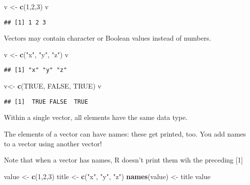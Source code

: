 \documentclass[
]{article}
\newenvironment{Shaded}{\begin{snugshade}}{\end{snugshade}}
\newcommand{\DecValTok}[1]{\textcolor[rgb]{0.00,0.00,0.81}{#1}}
\newcommand{\KeywordTok}[1]{\textcolor[rgb]{0.13,0.29,0.53}{\textbf{#1}}}
\newcommand{\NormalTok}[1]{#1}
\newcommand{\OtherTok}[1]{\textcolor[rgb]{0.56,0.35,0.01}{#1}}
\newcommand{\StringTok}[1]{\textcolor[rgb]{0.31,0.60,0.02}{#1}}
\begin{document}
\begin{Shaded}
\begin{Highlighting}[]
\NormalTok{  v <-}\StringTok{ }\KeywordTok{c}\NormalTok{(}\DecValTok{1}\NormalTok{,}\DecValTok{2}\NormalTok{,}\DecValTok{3}\NormalTok{)}
\NormalTok{  v}
\end{Highlighting}
\end{Shaded}

\begin{verbatim}
## [1] 1 2 3
\end{verbatim}

Vectors may contain character or Boolean values instead of numbers.

\begin{Shaded}
\begin{Highlighting}[]
\NormalTok{  v <-}\StringTok{ }\KeywordTok{c}\NormalTok{(}\StringTok{"x"}\NormalTok{, }\StringTok{"y"}\NormalTok{, }\StringTok{"z"}\NormalTok{)}
\NormalTok{  v}
\end{Highlighting}
\end{Shaded}

\begin{verbatim}
## [1] "x" "y" "z"
\end{verbatim}

\begin{Shaded}
\begin{Highlighting}[]
\NormalTok{  v<-}\StringTok{ }\KeywordTok{c}\NormalTok{(}\OtherTok{TRUE}\NormalTok{, }\OtherTok{FALSE}\NormalTok{, }\OtherTok{TRUE}\NormalTok{)}
\NormalTok{  v}
\end{Highlighting}
\end{Shaded}

\begin{verbatim}
## [1]  TRUE FALSE  TRUE
\end{verbatim}

Within a single vector, all elements have the same data type.

The elements of a vector can have names: these get printed, too. You add
names to a vector using another vector!

Note that when a vector has names, R doesn't print them wih the
preceding {[}1{]}

\begin{Shaded}
\begin{Highlighting}[]
\NormalTok{  value <-}\StringTok{ }\KeywordTok{c}\NormalTok{(}\DecValTok{1}\NormalTok{,}\DecValTok{2}\NormalTok{,}\DecValTok{3}\NormalTok{)}
\NormalTok{  title <-}\StringTok{ }\KeywordTok{c}\NormalTok{(}\StringTok{"x"}\NormalTok{, }\StringTok{"y"}\NormalTok{, }\StringTok{"z"}\NormalTok{)}
  \KeywordTok{names}\NormalTok{(value) <-}\StringTok{ }\NormalTok{title}
\NormalTok{  value}
\end{Highlighting}
\end{Shaded}
\end{document}
